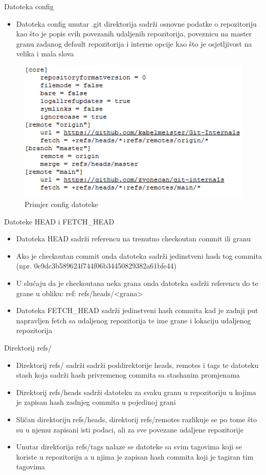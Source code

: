 \begin{frame}{Datoteka config}
	\begin{itemize}
		\item{Datoteka config unutar .git direktorija sadrži osnovne podatke o repozitoriju kao što je popis svih povezanih udaljenih repozitorija, poveznicu na master granu zadanog default repozitorija i interne opcije kao što je osjetljivost na velika i mala slova}
	\end{itemize}
	\begin{figure}
		\centering
		\includegraphics[width=0.65\linewidth]{img/config.png}
		\caption{Primjer config datoteke}
	\end{figure}
\end{frame}
\begin{frame}{Datoteke HEAD i FETCH\_HEAD}
	\begin{itemize}
		\item{Datoteka HEAD sadrži referencu na trenutno checkoutan commit ili granu}
		\item{Ako je checkoutan commit onda datoteka sadrži jedinstveni hash tog commita (npr. 0e9dc3b589624f744f06b34450829382a61bfe44)}
		\item{U slučaju da je checkoutana neka grana onda datoteka sadrži referencu do te grane u obliku: ref: refs/heads/<grana>}
		\item{Datoteka FETCH\_HEAD sadrži jedinstveni hash commita kad je zadnji put napravljen fetch sa udaljenog repozitorija te ime grane i lokaciju udaljenog repozitorija}
	\end{itemize}
\end{frame}
\begin{frame}{Direktorij refs/}
	\begin{itemize}
		\item{Direktorij refs/ sadrži sadrži poddirektorije heads, remotes i tags te datoteku stash koja sadrži hash privremenog commita sa stashanim promjenama}
		\item{Direktorij refs/heads sadrži datoteku za svaku granu u repozitoriju u kojima je zapisan hash zadnjeg commita u pojedinoj grani}
		\item{Sličan direktoriju refs/heads, direktorij refs/remotes razlikuje se po tome što su u njemu zapisani isti podaci, ali za sve povezane udaljene repozitorije}
		\item{Unutar direktorija refs/tags nalaze se datoteke sa svim tagovima koji se koriste u repozitoriju a u njima je zapisan hash commita koji je tagiran tim tagovima}
	\end{itemize}
\end{frame}
